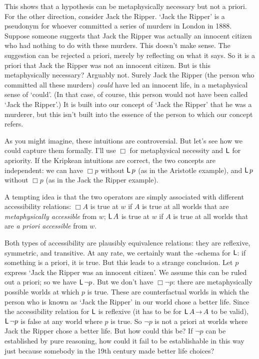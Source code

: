 This shows that a hypothesis can be metaphysically necessary but not a priori.
For the other direction,
consider Jack the Ripper.
`Jack the Ripper' is a pseudonym for whoever committed a series of murders in London in 1888.
Suppose someone suggests that
Jack the Ripper was actually an innocent citizen
who had nothing to do with these murders.
This doesn't make sense.
The suggestion can be rejected a priori,
merely by reflecting on what it says.
So it is a priori that Jack the Ripper was not an innocent citizen.
But is this metaphysically necessary?
Arguably not.
Surely Jack the Ripper
(the person who committed all these murders)
\emph{could} have led an innocent life,
in a metaphysical sense of `could'.
(In that case,
of course,
this person would not have been called `Jack the Ripper'.)
It is built into our concept of `Jack the Ripper' that he was a murderer,
but this isn't built into the essence of the person to which our concept refers.

As you might imagine,
these intuitions are controversial.
But let's see how we could capture them formally.
I'll use $\Box$ for metaphysical necessity and $\operatorname{\mathsf{L}}$ for apriority.
If the Kripkean intuitions are correct, 
the two concepts are independent:
we can have $\Box p$ without $\operatorname{\mathsf{L}} p$
(as in the Aristotle example),
and $\operatorname{\mathsf{L}} p$ without $\Box p$
(as in the Jack the Ripper example).

A tempting idea is that
the two operators are simply associated with different accessibility relations:
$\Box A$ is true at $w$ if $A$ is true at all worlds that are \emph{metaphysically accessible} from $w$;
$\operatorname{\mathsf{L}} A$ is true at $w$ if $A$ is true at all worlds that are \emph{a priori accessible} from $w$.

Both types of accessibility are plausibly equivalence relations:
they are reflexive, symmetric, and transitive.
At any rate,
we certainly want the -schema for $\operatorname{\mathsf{L}}$:
if something is a priori, it is true.
But this leads to a strange conclusion.
Let $p$ express `Jack the Ripper was an innocent citizen'.
We assume this can be ruled out a priori; so we have $\operatorname{\mathsf{L}} \neg p$.
But we don't have $\Box \neg p$:
there are metaphysically possible worlds at which $p$ is true.
These are counterfactual worlds in which the person who is known as `Jack the Ripper' in our world chose a better life.
Since the accessibility relation for $\operatorname{\mathsf{L}}$ is reflexive
(it has to be for $\apriori A \to A$ to be valid),
$\operatorname{\mathsf{L}} \neg p$ is false at any world where $p$ is true.
So $\neg p$ is not a priori at worlds where Jack the Ripper chose a better life.
But how could this be?
If $\neg p$ can be established by pure reasoning,
how could it fail to be establishable in this way just because somebody in the 19th century made better life choices?

